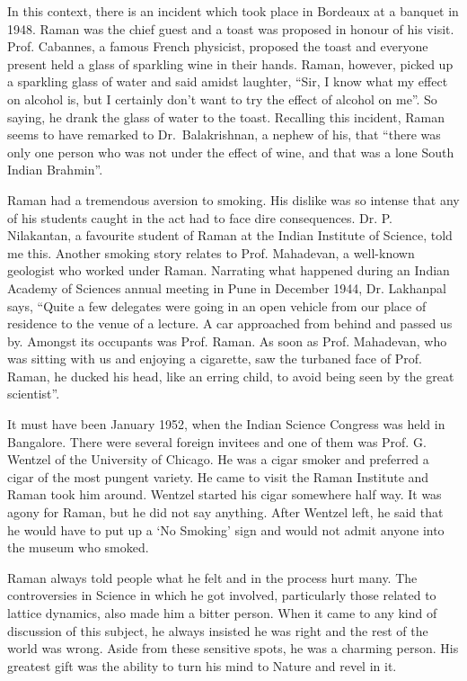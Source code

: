 In this context, there is an incident which took place in Bordeaux at a banquet in 1948. Raman was the chief guest and a toast was proposed in honour of his visit. Prof. Cabannes, a famous French physicist, proposed the toast and everyone present held a glass of sparkling wine in their hands. Raman, however, picked up a sparkling glass of water and said amidst laughter, ``Sir, I know what my effect on alcohol is, but I certainly don't want to try the effect of alcohol on me''. So saying, he drank the glass of water to the toast. Recalling this incident, Raman seems to have remarked to Dr.~Balakrishnan, a nephew of his, that ``there was only one person who was not under the effect of wine, and that was a lone South Indian Brahmin''.

Raman had a tremendous aversion to smoking. His dislike was so intense that any of his students caught in the act had to face dire consequences. Dr. P. Nilakantan, a favourite student of Raman at the Indian Institute of Science, told me this. Another smoking story relates to Prof. Mahadevan, a well-known geologist who worked under Raman. Narrating what happened during an Indian Academy of Sciences annual meeting in Pune in December 1944, Dr. Lakhanpal says, ``Quite a few delegates were going in an open vehicle from our place of residence to the venue of a lecture. A car approached from behind and passed us by. Amongst its occupants was Prof. Raman. As soon as Prof. Mahadevan, who was sitting with us and enjoying a cigarette, saw the turbaned face of Prof. Raman, he ducked his head, like an erring child, to avoid being seen by the great scientist''.

It must have been January 1952, when the Indian Science Con\-gress was held in Bangalore. There were several foreign invitees and one of them was Prof. G. Wentzel of the University of Chicago. He was a cigar smoker and preferred a cigar of the most pungent variety. He came to visit the Raman Institute and Raman took him around. Wentzel started his cigar somewhere half way. It was agony for Raman, but he did not say anything. After Wentzel left, he said that he would have to put up a `No Smoking' sign and would not admit anyone into the museum who smoked.

Raman always told people what he felt and in the process hurt many. The controversies in Science in which he got involved, particularly those related to lattice dynamics, also made him a bitter person. When it came to any kind of discussion of this subject, he always insisted he was right and the rest of the world was wrong. Aside from these sensitive spots, he was a charming person. His greatest gift was the ability to turn his mind to Nature and revel in it.

